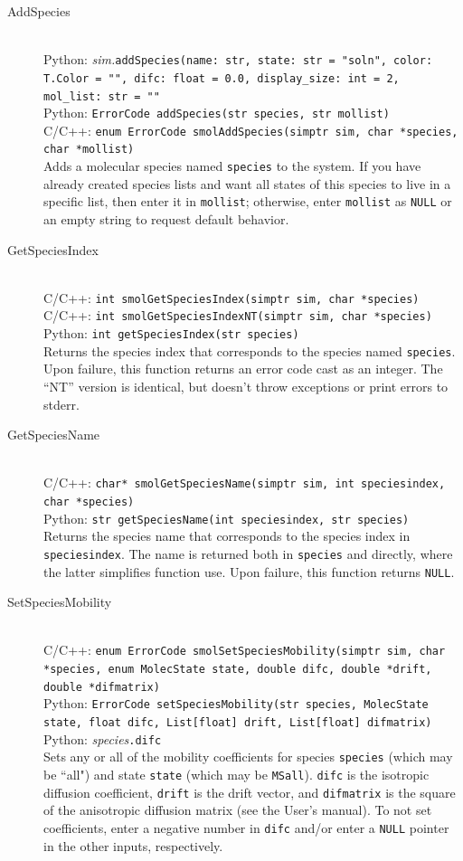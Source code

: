 \documentclass {scrbook}
\newcommand {\ttt} {\texttt}
\begin{document}
\begin{description}

\item[AddSpecies]
\hfill \\
Python: \textit{sim.}\ttt{addSpecies(name: str, state: str = "soln", color: T.Color = "", difc: float = 0.0, display\_size: int = 2, mol\_list: str = ""}\\
Python: \ttt{ErrorCode addSpecies(str species, str mollist)}\\
C/C++: \ttt{enum ErrorCode smolAddSpecies(simptr sim, char *species, char *mollist)}\\
Adds a molecular species named \ttt{species} to the system. If you have already created species lists and want all states of this species to live in a specific list, then enter it in \ttt{mollist}; otherwise, enter \ttt{mollist} as \ttt{NULL} or an empty string to request default behavior.

\item[GetSpeciesIndex]
\hfill \\
C/C++: \ttt{int smolGetSpeciesIndex(simptr sim, char *species)}\\
C/C++: \ttt{int smolGetSpeciesIndexNT(simptr sim, char *species)}\\
Python: \ttt{int getSpeciesIndex(str species)}\\
Returns the species index that corresponds to the species named \ttt{species}. Upon failure, this function returns an error code cast as an integer. The ``NT'' version is identical, but doesn't throw exceptions or print errors to stderr.

\item[GetSpeciesName]
\hfill \\
C/C++: \ttt{char* smolGetSpeciesName(simptr sim, int speciesindex, char *species)}\\
Python: \ttt{str getSpeciesName(int speciesindex, str species)}\\
Returns the species name that corresponds to the species index in \ttt{speciesindex}. The name is returned both in \ttt{species} and directly, where the latter simplifies function use. Upon failure, this function returns \ttt{NULL}.

\item[SetSpeciesMobility]
\hfill \\
C/C++: \ttt{enum ErrorCode smolSetSpeciesMobility(simptr sim, char *species, enum MolecState state, double difc, double *drift, double *difmatrix)}\\
Python: \ttt{ErrorCode setSpeciesMobility(str species, MolecState state, float difc, List[float] drift, List[float] difmatrix)}\\
Python: \textit{species}\ttt{.difc}\\
Sets any or all of the mobility coefficients for species \ttt{species} (which may be ``all") and state \ttt{state} (which may be \ttt{MSall}). \ttt{difc} is the isotropic diffusion coefficient, \ttt{drift} is the drift vector, and \ttt{difmatrix} is the square of the anisotropic diffusion matrix (see the User's manual). To not set coefficients, enter a negative number in \ttt{difc} and/or enter a \ttt{NULL} pointer in the other inputs, respectively.


\end{description}
\end{document}
